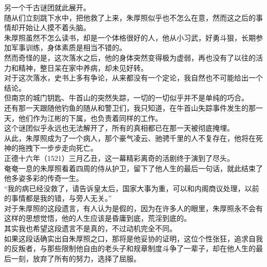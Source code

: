 \begin{multicols}{\theparacolNo}
另一个千古谜团就此展开。\\

随从们立刻跳下水中，把他救了上来，朱厚照似乎也不怎么在意，然而这之后的事情却开始让人摸不着头脑。\\

朱厚照虽然不怎么读书，却是一个体格很好的人，他从小习武，好勇斗狠，长期参加军事训练，身体素质是相当不错的。\\

然而奇怪的是，这次落水之后，他的身体突然变得极为虚弱，再也没有了以往的活力和精神，整日呆在家中养病，却未见好转。\\

对于这次落水，史书上多有争论，从来都没有一个定论，我自然也不可能给出一个结论。\\

但南京的城门钥匙、牛首山的突然失踪，一切的一切似乎并不是单纯的巧合。\\

还有那一天跟随他钓鱼的随从和警卫们，我只知道，在牛首山失踪事件发生的那一天，他们作为江彬的下属，也负责着同样的工作。\\

这个谜团似乎永远也无法解开了，所有的真相都已在那一天被彻底掩埋。\\

从此，朱厚照成为了一个病人，那个豪气凌云、驰骋千里的人不复存在，他将在死神的拖拽下一步步走向死亡。\\

正德十六年（1521）三月乙丑，这一幕精彩离奇的活剧终于演到了尽头。\\

奄奄一息的朱厚照看着四周的侍从护卫，留下了他人生的最后一句话，就此结束了他多姿多彩的传奇一生。\\

“我的病已经没救了，请告诉皇太后，国家大事为重，可以和内阁商议处理，以前的事情都是我的错，与旁人无关。”\\

对于朱厚照的这段遗言，有人认为是假的，因为在许多人的眼里，朱厚照永不会有这样的思想觉悟，他的人生应该是昏庸到底，荒淫到底的。\\

其实我也希望这段遗言不是真的，不过动机完全不同。\\

如果这段话确实出自朱厚照之口，那将是他妥协的证明，这位个性张狂，追求自我的反叛者，与那些限制他自由的老头子和规章制度斗争了一辈子，却在他人生的最后一刻，放弃了所有的努力，选择了屈服。\\


\end{multicols}
